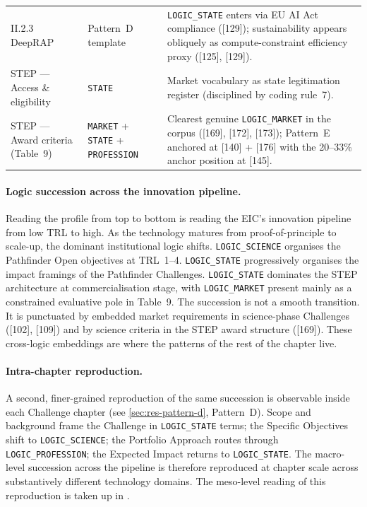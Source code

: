 \begin{table}[H]
\begin{tabularx}{\textwidth}{@{}
  >{\raggedright\arraybackslash}p{}
  >{\raggedright\arraybackslash}p{}
  X @{}}
II.2.3 DeepRAP
  & Pattern~D template
  & \texttt{LOGIC\_STATE} enters via EU AI Act compliance ([129]); sustainability appears obliquely as compute-constraint efficiency proxy ([125], [129]). \\
STEP --- Access \& eligibility
  & \texttt{STATE}
  & Market vocabulary as state legitimation register (disciplined by coding rule~7). \\
STEP --- Award criteria (Table~9)
  & \texttt{MARKET} + \texttt{STATE} + \texttt{PROFESSION}
  & Clearest genuine \texttt{LOGIC\_MARKET} in the corpus ([169], [172], [173]); Pattern~E anchored at [140] + [176] with the 20--33\% anchor position at [145]. \\
\bottomrule
\end{tabularx}
\end{table}

\paragraph{Logic succession across the innovation pipeline.}
Reading the profile from top to bottom is reading the EIC's
innovation pipeline from low TRL to high. As the technology matures
from proof-of-principle to scale-up, the dominant institutional logic
shifts. \texttt{LOGIC\_SCIENCE} organises the Pathfinder Open
objectives at TRL~1--4. \texttt{LOGIC\_STATE} progressively organises
the impact framings of the Pathfinder Challenges.
\texttt{LOGIC\_STATE} dominates the STEP architecture at
commercialisation stage, with \texttt{LOGIC\_MARKET} present mainly
as a constrained evaluative pole in Table~9. The succession is not a
smooth transition. It is punctuated by embedded market requirements
in science-phase Challenges ([102], [109]) and by science criteria in
the STEP award structure ([169]). These cross-logic embeddings are
where the patterns of the rest of the chapter live.

\paragraph{Intra-chapter reproduction.}
A second, finer-grained reproduction of the same succession is
observable inside each Challenge chapter (see
\cref{sec:res-pattern-d}, Pattern~D). Scope and background frame the
Challenge in \texttt{LOGIC\_STATE} terms; the Specific Objectives
shift to \texttt{LOGIC\_SCIENCE}; the Portfolio Approach routes
through \texttt{LOGIC\_PROFESSION}; the Expected Impact returns to
\texttt{LOGIC\_STATE}. The macro-level succession across the pipeline
is therefore reproduced at chapter scale across substantively
different technology domains. The meso-level reading of this
reproduction is taken up in .


